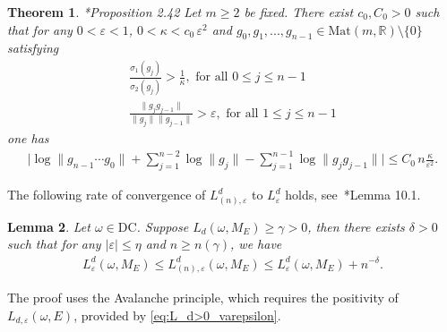 \documentclass[11pt]{amsart}
\newtheorem{theorem}{Theorem}[section]
\newtheorem{lemma}[theorem]{Lemma}
\newcommand{\R}{\mathbb R}
\begin{document}
\begin{theorem}\label{thm:APDK}\cite{DK}*{Proposition 2.42}
Let $m\ge 2$ be fixed. 
There exist $c_0, C_0>0$ such that for any $0<\varepsilon<1$, $0<\kappa<c_0\, \varepsilon^2$ and $g_0,g_1,...,g_{n-1}\in \mathrm{Mat}(m,\R)\setminus\{0\}$ satisfying 
\begin{align}
\frac{\sigma_1(g_j)}{\sigma_2(g_j)}>\frac{1}{\kappa}, \text{\ \  for all\ \  } 0\leq j\leq n-1\\
\frac{\|g_j g_{j-1}\|}{\|g_j\| \|g_{j-1}\|}>\varepsilon, \text{\ \  for all\ \  } 1\leq j\leq n-1
\end{align}
one has
\begin{align}
\Big| \log \|g_{n-1}\cdots g_0\|+\sum_{j=1}^{n-2}\log \|g_j\|-\sum_{j=1}^{n-1} \log \|g_j g_{j-1}\|\Big|\leq C_0\, n \frac{\kappa}{\varepsilon^2}.
\end{align}
\end{theorem}

The following rate of convergence of $L^d_{(n),\varepsilon}$ to $L^d_{\varepsilon}$ holds, see~\cite{GS1}*{Lemma 10.1}. 

\begin{lemma}\label{lem:Ln-L}
Let $\omega\in \mathrm{DC}$.
Suppose $L_d(\omega,M_E)\geq \gamma>0$, then there exists $\delta>0$ such that for any $|\varepsilon|\leq \eta$ and $n\geq n(\gamma)$, we have
\begin{align}
    L^d_{\varepsilon}(\omega,M_E)\leq L^d_{(n),\varepsilon}(\omega,M_E)\leq L^d_{\varepsilon}(\omega,M_E)+n^{-\delta}.
\end{align}
\end{lemma}
The proof uses the Avalanche principle, which requires the positivity of $L_{d,\varepsilon}(\omega,E)$, provided by \eqref{eq:L_d>0_varepsilon}.




 
\end{document}
